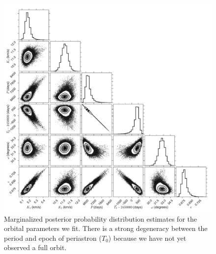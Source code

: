 \begin{figure}[t]
  \centering
  \includegraphics[width=\columnwidth]{Figures/paper4_corner.pdf}
  \caption{Marginalized posterior probability distribution estimates for the orbital parameters we fit. There is a strong degeneracy between the period and epoch of periastron ($T_0$) because we have not yet observed a full orbit.}
  \label{paper4_fig:posterior}
\end{figure}



